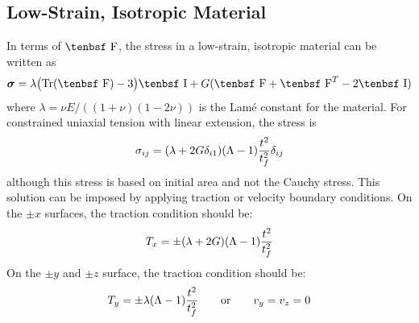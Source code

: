 \documentclass[11pt]{book}
\newcommand{\tens}[1]{\boldsymbol{\mathsf{#1}}}
\def\F{\hbox{\tenbsf F}}
\def\I{\hbox{\tenbsf I}}
\begin{document}
\subsection{Low-Strain, Isotropic Material}

In terms of $\F$, the stress in a low-strain, isotropic material can be written as
\begin{equation}
    \tens{\sigma} = \lambda \bigl({\rm Tr}(\F)-3\bigr)\I + G(\F + \F^T -2\I)
\end{equation}
where $\lambda = \nu E/((1+\nu)(1-2\nu))$ is the Lam\'e constant for the material. For constrained uniaxial tension with linear extension, the stress is
\begin{equation}
    \sigma_{ij} = (\lambda  + 2G\delta_{i1})(\Lambda-1){t^2\over t_f^2}\delta_{ij}
\end{equation}
although this stress is based on initial area and not the Cauchy stress. This solution can be imposed by applying traction or velocity boundary conditions. On the $\pm x$ surfaces, the traction condition should be:
\begin{equation}
            T_x = \pm (\lambda  + 2G)(\Lambda-1){t^2\over t_f^2} 
\end{equation}
On the $\pm y$ and $\pm z$ surface, the traction condition should be:
\begin{equation}
            T_y = \pm \lambda(\Lambda-1){t^2\over t_f^2}   \qquad{\rm or}\qquad v_y = v_z = 0
\end{equation}
\end{document}
